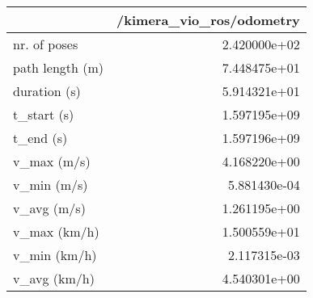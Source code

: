 \begin{tabular}{lr}
\toprule
{} &  /kimera\_vio\_ros/odometry \\
\midrule
nr. of poses    &              2.420000e+02 \\
path length (m) &              7.448475e+01 \\
duration (s)    &              5.914321e+01 \\
t\_start (s)     &              1.597195e+09 \\
t\_end (s)       &              1.597196e+09 \\
v\_max (m/s)     &              4.168220e+00 \\
v\_min (m/s)     &              5.881430e-04 \\
v\_avg (m/s)     &              1.261195e+00 \\
v\_max (km/h)    &              1.500559e+01 \\
v\_min (km/h)    &              2.117315e-03 \\
v\_avg (km/h)    &              4.540301e+00 \\
\bottomrule
\end{tabular}
